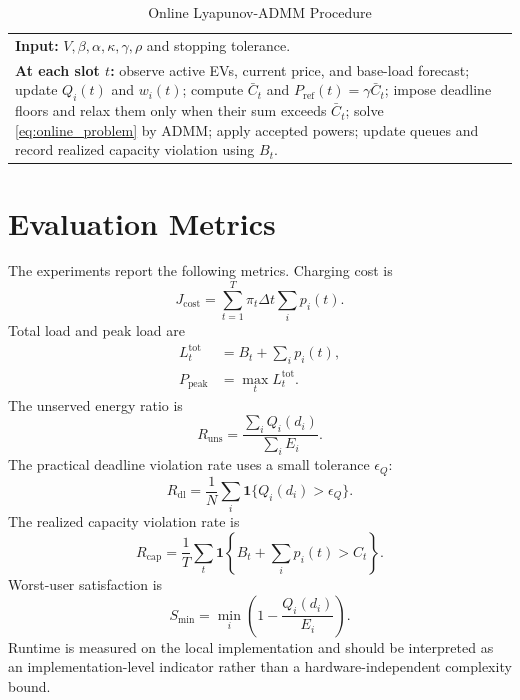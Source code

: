 \documentclass[journal]{IEEEtran}
\begin{document}
\begin{table}[!t]
\centering
\caption{Online Lyapunov-ADMM Procedure}
\label{tab:algorithm}
\begin{tabular}{p{}}
\toprule
\textbf{Input:} $V,\beta,\alpha,\kappa,\gamma,\rho$ and stopping tolerance.\\
\textbf{At each slot $t$:} observe active EVs, current price, and base-load forecast; update $Q_i(t)$ and $w_i(t)$; compute $\bar C_t$ and $P_{\mathrm{ref}}(t)=\gamma\bar C_t$; impose deadline floors and relax them only when their sum exceeds $\bar C_t$; solve \eqref{eq:online_problem} by ADMM; apply accepted powers; update queues and record realized capacity violation using $B_t$.\\
\bottomrule
\end{tabular}
\end{table}

\section{Evaluation Metrics}
The experiments report the following metrics. Charging cost is
\begin{equation}
J_{\mathrm{cost}}=\sum_{t=1}^{T}\pi_t\Delta t\sum_i p_i(t).
\label{eq:metric_cost}
\end{equation}
Total load and peak load are
\begin{align}
L_t^{\mathrm{tot}} &= B_t+\sum_i p_i(t), \label{eq:total_load}\\
P_{\mathrm{peak}} &= \max_t L_t^{\mathrm{tot}} . \label{eq:peak}
\end{align}
The unserved energy ratio is
\begin{equation}
R_{\mathrm{uns}}=
\frac{\sum_i Q_i(d_i)}{\sum_i E_i}.
\label{eq:unserved}
\end{equation}
The practical deadline violation rate uses a small tolerance $\epsilon_Q$:
\begin{equation}
R_{\mathrm{dl}}=
\frac{1}{N}\sum_i \mathbf{1}\{Q_i(d_i)>\epsilon_Q\}.
\label{eq:deadline_violation}
\end{equation}
The realized capacity violation rate is
\begin{equation}
R_{\mathrm{cap}}=
\frac{1}{T}\sum_t
\mathbf{1}\left\{B_t+\sum_i p_i(t)>C_t\right\}.
\label{eq:capacity_violation}
\end{equation}
Worst-user satisfaction is
\begin{equation}
S_{\min}=\min_i\left(1-\frac{Q_i(d_i)}{E_i}\right).
\label{eq:worst_satisfaction}
\end{equation}
Runtime is measured on the local implementation and should be interpreted as an implementation-level indicator rather than a hardware-independent complexity bound.
\end{document}
